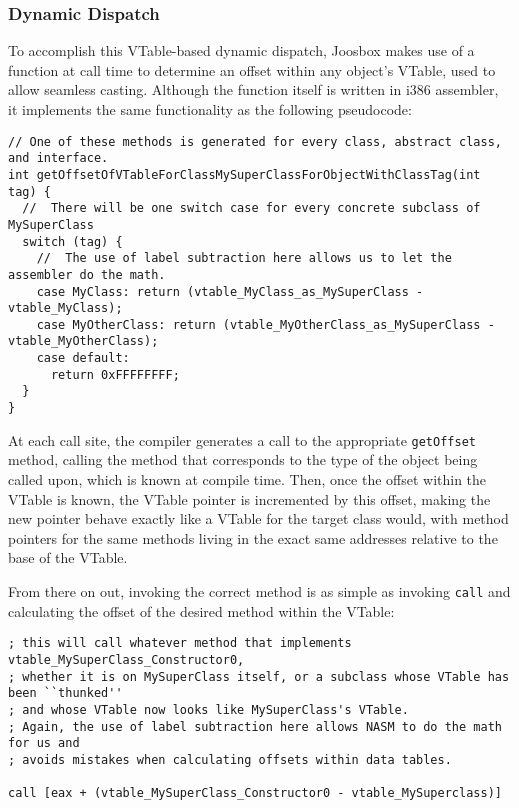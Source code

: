 \documentclass[letterpaper]{article}
\begin{document}
  \subsubsection{Dynamic Dispatch}

  To accomplish this VTable-based dynamic dispatch, Joosbox makes use of a function at call
  time to determine an offset within any object's VTable, used to allow seamless casting. Although
  the function itself is written in i386 assembler, it implements the same functionality as the following
  pseudocode:

  \begin{verbatim}
// One of these methods is generated for every class, abstract class, and interface.
int getOffsetOfVTableForClassMySuperClassForObjectWithClassTag(int tag) {
  //  There will be one switch case for every concrete subclass of MySuperClass
  switch (tag) {
    //  The use of label subtraction here allows us to let the assembler do the math.
    case MyClass: return (vtable_MyClass_as_MySuperClass - vtable_MyClass);
    case MyOtherClass: return (vtable_MyOtherClass_as_MySuperClass - vtable_MyOtherClass);
    case default:
      return 0xFFFFFFFF;
  }
}
  \end{verbatim}

  At each call site, the compiler generates a call to the appropriate {\tt getOffset} method,
  calling the method that corresponds to the type of the object being called upon, which is known at compile
  time. Then, once the offset within the VTable is known, the VTable pointer is incremented by this offset,
  making the new pointer behave exactly like a VTable for the target class would, with method pointers for
  the same methods living in the exact same addresses relative to the base of the VTable.

  From there on out, invoking the correct method is as simple as invoking {\tt call} and
  calculating the offset of the desired method within the VTable:

  \begin{verbatim}
; this will call whatever method that implements vtable_MySuperClass_Constructor0,
; whether it is on MySuperClass itself, or a subclass whose VTable has been ``thunked''
; and whose VTable now looks like MySuperClass's VTable.
; Again, the use of label subtraction here allows NASM to do the math for us and
; avoids mistakes when calculating offsets within data tables.

call [eax + (vtable_MySuperClass_Constructor0 - vtable_MySuperclass)]
  \end{verbatim}
\end{document}
